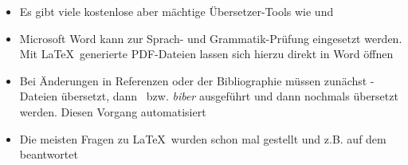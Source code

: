 \smallskip
\begin{itemize}[label={\faLightbulbO}]
    \item Es gibt viele kostenlose aber mächtige Übersetzer-Tools wie  und 
    \item Microsoft Word kann zur Sprach- und Grammatik-Prüfung eingesetzt werden. Mit \LaTeX\ generierte PDF-Dateien lassen sich hierzu direkt in Word öffnen
    \item Bei Änderungen in Referenzen oder der Bibliographie müssen zunächst -Dateien übersetzt, dann \bibtex\ bzw. \emph{biber} ausgeführt und dann nochmals übersetzt werden. Diesen Vorgang automatisiert 
    \item Die meisten Fragen zu \LaTeX\ wurden schon mal gestellt und z.B. auf dem  beantwortet
\end{itemize}

